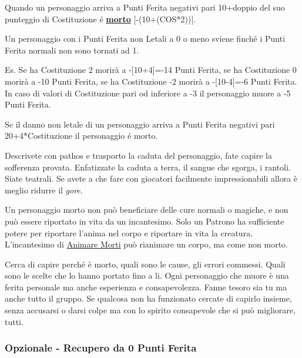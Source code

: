 \begin{multicols}{2}
Quando un personaggio arriva a Punti Ferita negativi pari 10+doppio del suo punteggio di Costituzione é \hyperlink{morto}{\textbf{morto}} [-(10+(COS*2))].

Un personaggio con i Punti Ferita non Letali a 0 o meno sviene finché i Punti Ferita normali non sono tornati ad 1.

Es. Se ha Costituzione 2 morirà a -[10+4]=-14 Punti Ferita, se ha Costituzione 0 morirà a -10 Punti Ferita, se ha Costituzione -2 morirà a -[10-4]=-6 Punti Ferita. In caso di valori di Costituzione pari od inferiore a -3 il personaggio muore a -5 Punti Ferita.

Se il danno non letale di un personaggio arriva a Punti Ferita negativi pari 20+4*Costituzione il personaggio é morto.\hypertarget{puntiferitatemporaneimorte}{}

\begin{narratore}[Recitare]
Descrivete con pathos e trasporto la caduta del personaggio, fate capire la sofferenza provata. Enfatizzate la caduta a terra, il sangue che sgorga, i rantoli. Siate teatrali.
Se avete a che fare con giocatori facilmente impressionabili allora è meglio ridurre il \emph{gore}.
\end{narratore}

Un personaggio morto non può beneficiare delle cure normali o magiche, e non può essere riportato in vita da un incantesimo. Solo un Patrono ha sufficiente potere per riportare l'anima nel corpo e riportare in vita la creatura. L'incantesimo di \hyperlink{Animare Morti}{Animare Morti} può rianimare un corpo, ma come non morto.

\begin{giocatore}
Cerca di capire perché è morto, quali sono le cause, gli errori commessi. Quali sono le scelte che lo hanno portato fino a li. Ogni personaggio che muore è una ferita personale ma anche esperienza e consapevolezza. Fanne tesoro sia tu ma anche tutto il gruppo. Se qualcosa non ha funzionato cercate di capirlo insieme, senza accusarsi o darsi colpe ma con lo spirito consapevole che si può migliorare, tutti.
\end{giocatore}

\subsubsection{Opzionale - Recupero da 0 Punti Ferita}  \label{recuperozeropf}


\end{multicols}
